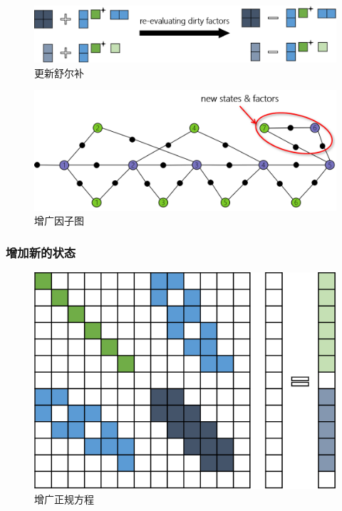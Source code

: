 \begin{figure}[htb!]
    \centering
    \includegraphics[width=\textwidth]{figs/schur_update.png}
    \caption{更新舒尔补}
\end{figure}

\begin{figure}[htb!]
    \centering
    \includegraphics[width=.8\textwidth]{figs/factor_graph_aug.png}
    \caption{增广因子图}
\end{figure}

\subsubsection*{增加新的状态}

\begin{figure}[htb!]
    \centering
    \includegraphics{figs/normal_eq_aug.png}
    \caption{增广正规方程}
\end{figure}

